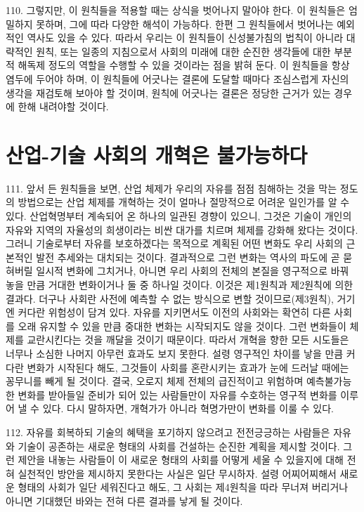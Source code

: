 \documentclass[11pt,a4paper]{article}
\begin{document}
\begin{multicols}{2}
110. 그렇지만, 이 원칙들을 적용할 때는 상식을 벗어나지 말아야 한다. 이 원칙들은 엄밀하지 못하며,  그에 따라 다양한 해석이 가능하다. 한편 그 원칙들에서 벗어나는 예외적인 역사도 있을 수 있다. 따라서  우리는 이 원칙들이 신성불가침의 법칙이 아니라 대략적인 원칙, 또는 일종의 지침으로서 사회의 미래에  대한 순진한 생각들에 대한 부분적 해독제 정도의 역할을 수행할 수 있을 것이라는 점을 밝혀 둔다. 이  원칙들을 항상 염두에 두어야 하며, 이 원칙들에 어긋나는 결론에 도달할 때마다 조심스럽게 자신의  생각을 재검토해 보아야 할 것이며, 원칙에 어긋나는 결론은 정당한 근거가 있는 경우에 한해 내려야할  것이다. 


\section*{산업-기술 사회의 개혁은 불가능하다} 


111. 앞서 든 원칙들을 보면, 산업 체제가 우리의 자유를 점점 침해하는 것을 막는 정도의 방법으로는  산업 체제를 개혁하는 것이 얼마나 절망적으로 어려운 일인가를 알 수 있다. 산업혁명부터 계속되어 온 하나의 일관된 경향이 있으니, 그것은 기술이 개인의 자유와 지역의 자율성의 희생이라는 비싼 대가를  치르며 체제를 강화해 왔다는 것이다. 그러니 기술로부터 자유를 보호하겠다는 목적으로 계획된 어떤 
변화도 우리 사회의 근본적인 발전 추세와는 대치되는 것이다. 결과적으로 그런 변화는 역사의 파도에 곧 묻혀버릴 일시적 변화에 그치거나, 아니면 우리 사회의 전체의 본질을 영구적으로 바꿔 놓을 만큼 거대한  변화이거나 둘 중 하나일 것이다. 이것은 제1원칙과 제2원칙에 의한 결과다. 더구나 사회란 사전에  예측할 수 없는 방식으로 변할 것이므로(제3원칙), 거기엔 커다란 위험성이 담겨 있다. 자유를  지키면서도 이전의 사회와는 확연히 다른 사회를 오래 유지할 수 있을 만큼 중대한 변화는 시작되지도  않을 것이다. 그런 변화들이 체제를 교란시킨다는 것을 깨달을 것이기 때문이다. 따라서 개혁을 향한 모든 시도들은 너무나 소심한 나머지 아무런 효과도 보지 못한다. 설령 영구적인 차이를 낳을 만큼 커다란  변화가 시작된다 해도, 그것들이 사회를 혼란시키는 효과가 눈에 드러날 때에는 꽁무니를 빼게 될 것이다. 결국, 오로지 체제 전체의 급진적이고 위험하며 예측불가능한 변화를 받아들일 준비가 되어 있는  사람들만이 자유를 수호하는 영구적 변화를 이루어 낼 수 있다. 다시 말하자면, 개혁가가 아니라  혁명가만이 변화를 이룰 수 있다.  


112. 자유를 회복하되 기술의 혜택을 포기하지 않으려고 전전긍긍하는 사람들은 자유와 기술이 공존하는 새로운 형태의 사회를 건설하는 순진한 계획을 제시할 것이다. 그런 제안을 내놓는 사람들이 이 새로운  형태의 사회를 어떻게 세울 수 있을지에 대해 전혀 실천적인 방안을 제시하지 못한다는 사실은 일단 무시하자. 설령 어찌어찌해서 새로운 형태의 사회가 일단 세워진다고 해도, 그 사회는 제4원칙을 따라  무너져 버리거나 아니면 기대했던 바와는 전혀 다른 결과를 낳게 될 것이다.  



\end{multicols}
\end{document}
